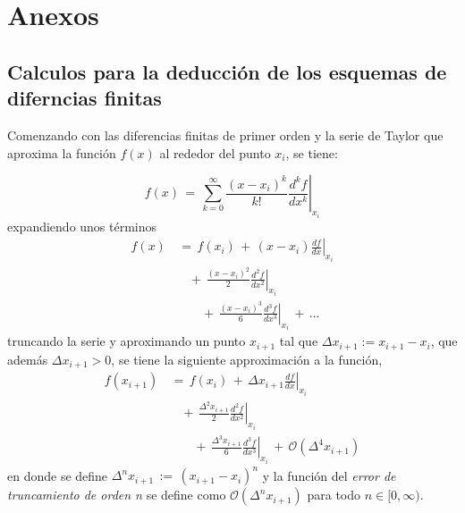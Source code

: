 \documentclass[9pt,technote,twoside,letterpaper,onecolumn]{IEEEtran}
\begin{document}
\newpage
\section{Anexos}
\label{sec:anexos}

\subsection{Calculos para la deducción de los esquemas de diferncias finitas}
\begin{multicols}{2}
Comenzando con las diferencias finitas de primer orden y la serie de Taylor que aproxima la función $f(x)$ al rededor del punto $x_i$, se tiene:

\begin{equation}
  f(x)\,=\,\sum^\infty_{k=0}\frac{(x-x_i)^k}{k!}\left.\frac{d^kf}{dx^k}\right|_{x_i}
  \label{eq:taylor}
\end{equation}
expandiendo unos términos
\begin{equation}
  \begin{split}
    f(x)&\,=\,f(x_i)\,+\,(x-x_i)\left.\frac{df}{dx}\right|_{x_i}\\
    &\quad+\,\frac{(x-x_i)^2}{2}\left.\frac{d^2f}{dx^2}\right|_{x_i}\\
    &\qquad+\,\frac{(x-x_i)^3}{6}\left.\frac{d^3f}{dx^3}\right|_{x_i}\,+\,\ldots
  \end{split}
  \label{eq:taylorexp}
\end{equation}
truncando la serie y aproximando un punto $x_{i+1}$ tal que $\Delta x_{i+1}:=x_{i+1}-x_i$, que además $\Delta x_{i+1}>0$, se tiene la siguiente approximación a la función,
\begin{equation}
  \begin{split}
    f(x_{i+1})&\,=\,f(x_i)\,+\,\Delta x_{i+1}\left.\frac{df}{dx}\right|_{x_i}\\
    &\quad+\,\frac{\Delta^2 x_{i+1}}{2}\left.\frac{d^2f}{dx^2}\right|_{x_i}\\
    &\qquad+\,\frac{\Delta^3 x_{i+1}}{6}\left.\frac{d^3f}{dx^3}\right|_{x_i}\,+\,\mathcal{O}(\Delta^4 x_{i+1})
  \end{split}
  \label{eq:taylorapprx}
\end{equation}
en donde se define $\Delta^n x_{i+1}\,:=\,(x_{i+1}-x_i)^n$ y la función del \emph{error de truncamiento de orden n} se define como $\mathcal{O}(\Delta^n x_{i+1})$ para todo $n\in[0,\infty)$.


\end{multicols}
\end{document}
